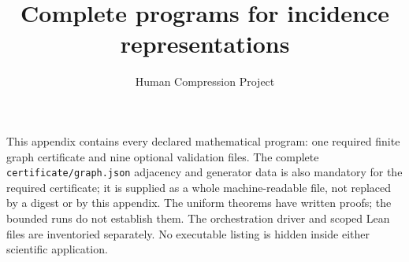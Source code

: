 
\title{Complete programs for incidence representations}
\author{Human Compression Project}\date{}
\maketitle
This appendix contains every declared mathematical program: one required
finite graph certificate and nine optional validation files. The complete
\texttt{certificate/graph.json} adjacency and generator data is also mandatory
for the required certificate; it is supplied as a whole machine-readable file,
not replaced by a digest or by this appendix. The uniform theorems have written
proofs; the bounded runs do not establish them. The orchestration driver and
scoped Lean files are inventoried separately. No executable listing is hidden
inside either scientific application.
\section*{}
\section*{}
\section*{}
\section*{}
\section*{}
\section*{}
